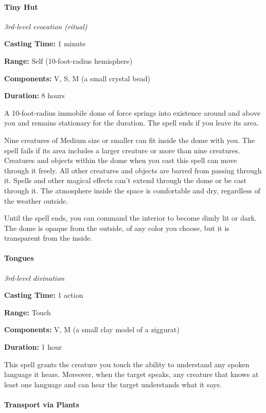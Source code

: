 \documentclass[
]{article}
\begin{document}
\hypertarget{tiny-hut}{%
\paragraph{Tiny Hut}\label{tiny-hut}}

\emph{3rd-level evocation (ritual)}

\textbf{Casting Time:} 1 minute

\textbf{Range:} Self (10-foot-radius hemisphere)

\textbf{Components:} V, S, M (a small crystal bead)

\textbf{Duration:} 8 hours

A 10-foot-radius immobile dome of force springs into existence around
and above you and remains stationary for the duration. The spell ends if
you leave its area.

Nine creatures of Medium size or smaller can fit inside the dome with
you. The spell fails if its area includes a larger creature or more than
nine creatures. Creatures and objects within the dome when you cast this
spell can move through it freely. All other creatures and objects are
barred from passing through it. Spells and other magical effects can't
extend through the dome or be cast through it. The atmosphere inside the
space is comfortable and dry, regardless of the weather outside.

Until the spell ends, you can command the interior to become dimly lit
or dark. The dome is opaque from the outside, of any color you choose,
but it is transparent from the inside.

\hypertarget{tongues}{%
\paragraph{Tongues}\label{tongues}}

\emph{3rd-level divination}

\textbf{Casting Time:} 1 action

\textbf{Range:} Touch

\textbf{Components:} V, M (a small clay model of a ziggurat)

\textbf{Duration:} 1 hour

This spell grants the creature you touch the ability to understand any
spoken language it hears. Moreover, when the target speaks, any creature
that knows at least one language and can hear the target understands
what it says.

\hypertarget{transport-via-plants}{%
\paragraph{Transport via Plants}\label{transport-via-plants}}
\end{document}
